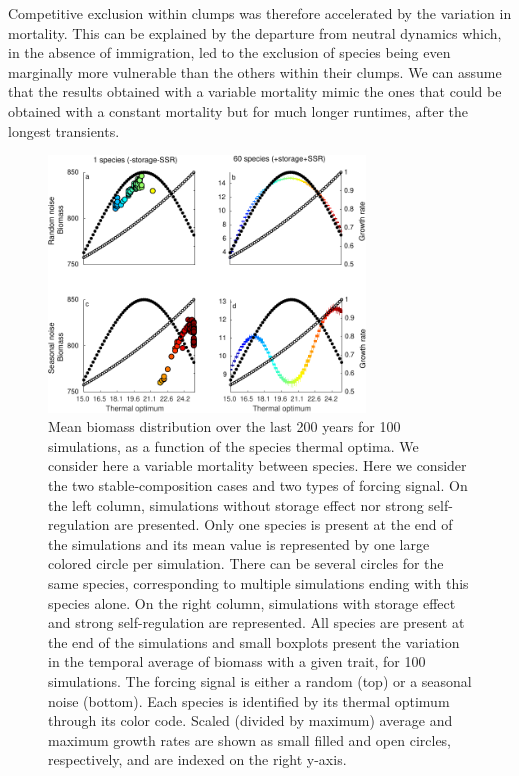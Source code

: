 \documentclass[a4paper,12pt]{article}
\begin{document}
Competitive exclusion within clumps was therefore accelerated by the variation in mortality. This can be explained by the departure from neutral dynamics which, in the absence of immigration, led to the exclusion of species being even marginally more vulnerable than the others within their clumps. We can assume that the results obtained with a variable mortality mimic the ones that could be obtained with a constant mortality but for much longer runtimes, after the longest transients. 

\begin{figure}[!ht]
\begin{centering}
\includegraphics[width=0.75\textwidth]{Fig3_morta_variable-eps-converted-to.pdf}
\par\end{centering}
\caption{Mean biomass distribution over the last 200 years for 100 simulations, as a function of the species thermal optima. 
We consider here a variable mortality between species. Here we consider the
two stable-composition cases and two types of forcing signal. On the
left column, simulations without storage effect nor strong self-regulation
are presented. Only one species is present at the end of the simulations
and its mean value is represented by one large colored circle per
simulation. There can be several circles for the same species, corresponding
to multiple simulations ending with this species alone. On the right
column, simulations with storage effect and strong self-regulation
are represented. All species are present at the end of the simulations
and small boxplots present the variation in the temporal average of
biomass with a given trait, for 100 simulations. The forcing signal
is either a random (top) or a seasonal noise (bottom). Each species
is identified by its thermal optimum through its color code. Scaled
(divided by maximum) average and maximum growth rates are shown as
small filled and open circles, respectively, and are indexed on the
right y-axis.\label{fig:Fig3_morta_variable}}
\end{figure}
\end{document}
